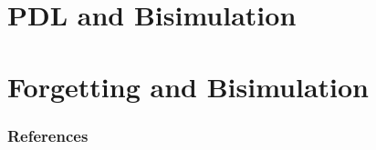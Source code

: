 \section{PDL and Bisimulation}

 
%  
%  
%  
% 
%















\section{Forgetting and Bisimulation}








\begin{frame}[allowframebreaks] %
        \frametitle{References}
        
        
\end{frame}

